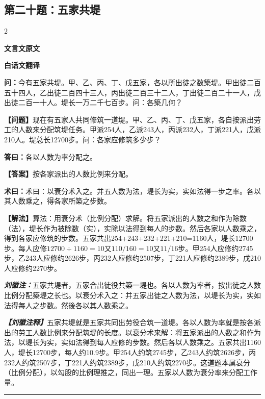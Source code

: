 \documentclass[10pt,a4paper]{article}
\newcommand{\wen}[1]{\textbf{\color{problemcolor}问：}#1\par}
\newcommand{\da}[1]{\textbf{答曰：}#1\par}
\newcommand{\shu}[1]{\textbf{术曰：}#1\par}
\newcommand{\liuhui}[1]{{\color{commentarycolor}\textit{\textbf{刘徽注：}}#1\par}}
\newcommand{\classicalheader}[1]{{\centering\large\bfseries\color{classicalcolor} #1\par\vspace{0.5em}}}
\newcommand{\wenmodern}[1]{\textbf{\color{moderncolor}【问题】}#1\par}
\newcommand{\damodern}[1]{\textbf{【答案】}#1\par}
\newcommand{\shumodern}[1]{\textbf{【解法】}#1\par}
\newcommand{\liuhuimodern}[1]{{\color{commentarycolor}\textit{\textbf{【刘徽注释】}}#1\par}}
\newcommand{\modernheader}[1]{{\centering\large\bfseries\color{moderncolor} #1\par\vspace{0.5em}}}
\newcommand{\problemsec}[1]{\subsection*{#1}}
\begin{document}
\problemsec{第二十题：五家共堤}
\begin{paracol}{2}
\classicalheader{文言文原文}
\switchcolumn
\modernheader{白话文翻译}
\switchcolumn*

\wen{今有五家共堤。甲、乙、丙、丁、戊五家，各以所出徒之数築堤。甲出徒二百五十四人，乙出徒二百四十三人，丙出徒二百三十二人，丁出徒二百二十一人，戊出徒二百一十人。堤长一万二千七百步。问：各築几何？}

\switchcolumn

\wenmodern{现在有五家人共同修筑一道堤。甲、乙、丙、丁、戊五家，各自按派出劳工的人数来分配筑堤任务。甲派254人，乙派243人，丙派232人，丁派221人，戊派210人。堤总长12700步。问：各家应修筑多少步？}

\switchcolumn*

\da{各以人数为率分配之。}

\switchcolumn

\damodern{按各家派出的人数比例来分配。}

\switchcolumn*

\shu{术曰：以衰分术入之。并五人数为法，堤长为实，实如法得一步之率。各以其人数乘之，得各家所築之步数。}

\switchcolumn

\shumodern{算法：用衰分术（比例分配）求解。将五家派出的人数之和作为除数（法），堤长作为被除数（实），实除以法得到每人的步数。然后各家以人数乘之，得到各家应修筑的步数。五家共出254+243+232+221+210=1160人，堤长12700步。每人应修$12700\div1160=10$又$110/160=10$又$11/16$步。甲254人应修约2745步，乙243人应修约2626步，丙232人应修约2507步，丁221人应修约2389步，戊210人应修约2270步。}

\switchcolumn*

\liuhui{五家共堤者，五家合出徒役共築一堤也。各以人数为率者，按出徒之人数比例分配築堤之长也。以衰分术入之：并五家出徒之人数为法，以堤长为实，实如法得每人之步数。然後各以其人数乘之。}

\switchcolumn

\liuhuimodern{五家共堤就是五家共同出劳役合筑一道堤。各以人数为率就是按各派出的劳工人数比例来分配筑堤的长度。以衰分术来解：将五家派出的人数之和作为法，以堤长为实，实如法得到每人应修的步数。然后各以人数乘之。五家共出1160人，堤长12700步，每人约10.9步。甲254人约筑2745步，乙243人约筑2626步，丙232人约筑2507步，丁221人约筑2389步，戊210人约筑2270步。这道题本属衰分（比例分配），以勾股的比例理推之，同出一理。五家以人数为衰分率来分配工作量。}

\end{paracol}

\vspace{0.3cm}
\hrule
\vspace{0.3cm}
\end{document}
